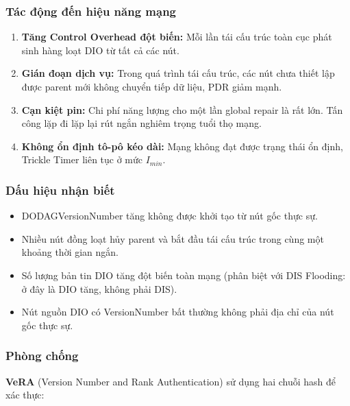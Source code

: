 \subsubsection{Tác động đến hiệu năng mạng}

\begin{enumerate}
    \item \textbf{Tăng Control Overhead đột biến:} Mỗi lần tái cấu trúc
          toàn cục phát sinh hàng loạt DIO từ tất cả các nút.

    \item \textbf{Gián đoạn dịch vụ:} Trong quá trình tái cấu trúc,
          các nút chưa thiết lập được parent mới không chuyển tiếp dữ
          liệu, PDR giảm mạnh.

    \item \textbf{Cạn kiệt pin:} Chi phí năng lượng cho một lần global
          repair là rất lớn. Tấn công lặp đi lặp lại rút ngắn nghiêm
          trọng tuổi thọ mạng.

    \item \textbf{Không ổn định tô-pô kéo dài:} Mạng không đạt được
          trạng thái ổn định, Trickle Timer liên tục ở mức $I_{min}$.
\end{enumerate}

\subsubsection{Dấu hiệu nhận biết}

\begin{itemize}
    \item DODAGVersionNumber tăng không được khởi tạo từ nút gốc thực sự.
    \item Nhiều nút đồng loạt hủy parent và bắt đầu tái cấu trúc trong
          cùng một khoảng thời gian ngắn.
    \item Số lượng bản tin DIO tăng đột biến toàn mạng (phân biệt với
          DIS Flooding: ở đây là DIO tăng, không phải DIS).
    \item Nút nguồn DIO có VersionNumber bất thường không phải địa
          chỉ của nút gốc thực sự.
\end{itemize}

\subsubsection{Phòng chống}

\textbf{VeRA} (Version Number and Rank Authentication) \cite{dvir2011vera}
sử dụng hai chuỗi hash để xác thực:

